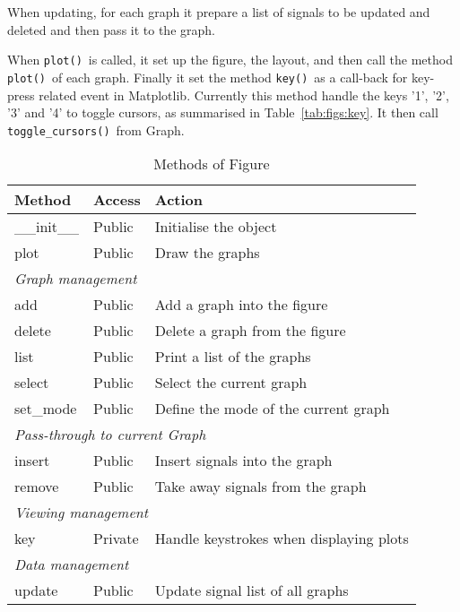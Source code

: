 \documentclass[a4paper,11pt]{article}
\newcommand{\meth}[1]{\texttt{#1()}}
\newcommand{\cls}[1]{\textsf{#1}}
\newcommand{\graph}{\cls{Graph}}
\newcommand{\fig}{\cls{Figure}}
\begin{document}
When updating, for each graph it prepare a list of signals to be updated and deleted and then pass it to the graph.

When \meth{plot}\ is called, it set up the figure, the layout, and then call the method \meth{plot}\ of each graph.
Finally it set the method \meth{key}\ as a call-back for key-press related event in Matplotlib.
Currently this method handle the keys '1', '2', '3' and '4' to toggle cursors, as summarised in Table~\ref{tab:figs:key}.
It then call \meth{toggle\_cursors}\ from \graph.

\begin{table}[htbp]
  \centering\sf\small
  \begin{tabular}{lll}
    \hline
    Method & Access & Action \\
    \hline
    \_\_init\_\_ & Public & Initialise the object \\
    plot & Public & Draw the graphs\\
    \multicolumn{3}{l}{\textit{Graph management}} \\
    add & Public & Add a graph into the figure \\
    delete & Public & Delete a graph from the figure \\
    list & Public & Print a list of the graphs\\
    select & Public & Select the current graph \\
    set\_mode & Public & Define the mode of the current graph\\
    \multicolumn{3}{l}{\textit{Pass-through to current Graph}} \\
    insert & Public & Insert signals into the graph\\
    remove & Public & Take away signals from the graph\\
    \multicolumn{3}{l}{\textit{Viewing management}} \\
    key & Private & Handle keystrokes when displaying plots \\
    \multicolumn{3}{l}{\textit{Data management}} \\
    update & Public & Update signal list of all graphs\\
    \hline
  \end{tabular}
  \caption{Methods of \fig}
  \label{tab:figs:meth}
\end{table}
\end{document}

